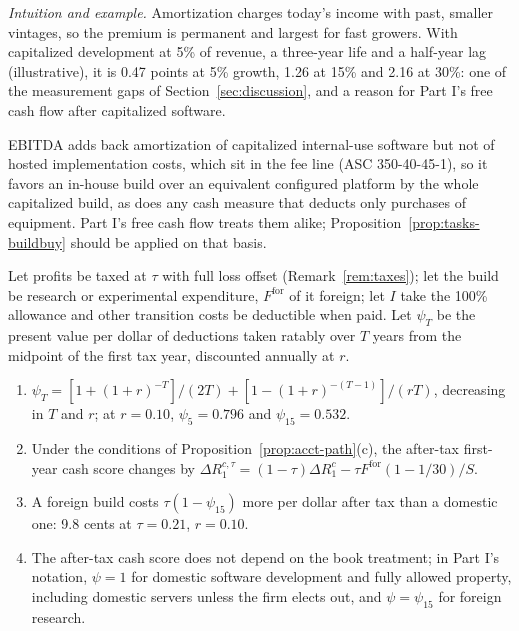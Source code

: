 \noindent\emph{Intuition and example.} Amortization charges today's income with past, smaller vintages, so the premium is permanent and largest for fast growers. With capitalized development at 5\% of revenue, a three-year life and a half-year lag (illustrative), it is 0.47 points at 5\% growth, 1.26 at 15\% and 2.16 at 30\%: one of the measurement gaps of Section~\ref{sec:discussion}, and a reason for Part I's free cash flow after capitalized software.

\begin{remark}\label{rem:acct-ebitda}
EBITDA adds back amortization of capitalized internal-use software but not of hosted implementation costs, which sit in the fee line (ASC 350-40-45-1), so it favors an in-house build over an equivalent configured platform by the whole capitalized build, as does any cash measure that deducts only purchases of equipment. Part I's free cash flow treats them alike; Proposition~\ref{prop:tasks-buildbuy} should be applied on that basis.
\end{remark}

\begin{proposition}\label{prop:acct-tax}
Let profits be taxed at $\tau$ with full loss offset (Remark~\ref{rem:taxes}); let the build be research or experimental expenditure, $F^{\mathrm{for}}$ of it foreign; let $I$ take the 100\% allowance and other transition costs be deductible when paid. Let $\psi_T$ be the present value per dollar of deductions taken ratably over $T$ years from the midpoint of the first tax year, discounted annually at $r$.
\begin{enumerate}
\item[(a)] $\psi_T=[1+(1+r)^{-T}]/(2T)+[1-(1+r)^{-(T-1)}]/(rT)$, decreasing in $T$ and $r$; at $r=0.10$, $\psi_5=0.796$ and $\psi_{15}=0.532$.
\item[(b)] Under the conditions of Proposition~\ref{prop:acct-path}(c), the after-tax first-year cash score changes by $\Delta R^{c,\tau}_1=(1-\tau)\Delta R^c_1-\tau F^{\mathrm{for}}(1-1/30)/S$.
\item[(c)] A foreign build costs $\tau(1-\psi_{15})$ more per dollar after tax than a domestic one: 9.8 cents at $\tau=0.21$, $r=0.10$.
\item[(d)] The after-tax cash score does not depend on the book treatment; in Part I's notation, $\psi=1$ for domestic software development and fully allowed property, including domestic servers unless the firm elects out, and $\psi=\psi_{15}$ for foreign research.
\end{enumerate}
\end{proposition}

